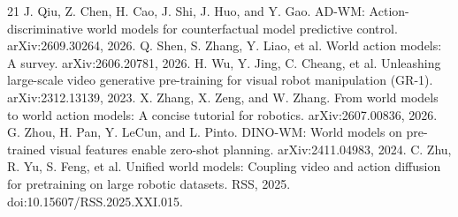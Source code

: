 \documentclass[11pt]{article}
\begin{document}
{\begin{thebibliography}{21}
 J. Qiu, Z. Chen, H. Cao, J. Shi, J. Huo, and Y. Gao. AD-WM: Action-discriminative world models for counterfactual model predictive control. arXiv:2609.30264, 2026.
 Q. Shen, S. Zhang, Y. Liao, et al. World action models: A survey. arXiv:2606.20781, 2026.
 H. Wu, Y. Jing, C. Cheang, et al. Unleashing large-scale video generative pre-training for visual robot manipulation (GR-1). arXiv:2312.13139, 2023.
 X. Zhang, X. Zeng, and W. Zhang. From world models to world action models: A concise tutorial for robotics. arXiv:2607.00836, 2026.
 G. Zhou, H. Pan, Y. LeCun, and L. Pinto. DINO-WM: World models on pre-trained visual features enable zero-shot planning. arXiv:2411.04983, 2024.
 C. Zhu, R. Yu, S. Feng, et al. Unified world models: Coupling video and action diffusion for pretraining on large robotic datasets. RSS, 2025. doi:10.15607/RSS.2025.XXI.015.
\end{thebibliography}
}
\end{document}
